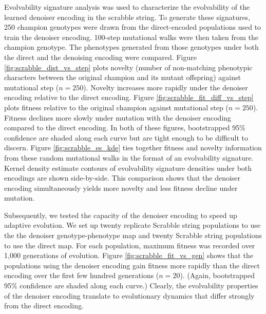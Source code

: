 Evolvability signature analysis was used to characterize the evolvability of the learned denoiser encoding in the scrabble string.
To generate these signatures, 250 champion genotypes were drawn from the direct-encoded populations used to train the denoiser encoding.
100-step mutational walks were then taken from the champion genotype.
The phenotypes generated from those genotypes under both the direct and the denoising encoding were compared.
Figure \ref{fig:scrabble_dist_vs_step} plots novelty (number of non-matching phenotypic characters between the original champion and its mutant offspring) against mutational step ($n=250$).
Novelty increases more rapidly under the denoiser encoding relative to the direct encoding.
Figure \ref{fig:scrabble_fit_diff_vs_step} plots fitness relative to the original champion against mutational step ($n=250$).
Fitness declines more slowly under mutation with the denoiser encoding compared to the direct encoding.
In both of these figures, bootstrapped 95\% confidence are shaded along each curve but are tight enough to be difficult to discern.
Figure \ref{fig:scrabble_es_kde} ties together fitness and novelty information from these random mutational walks in the format of an evolvability signature.
Kernel density estimate contours of evolvability signature densities under both encodings are shown side-by-side.
This comparison shows that the denoiser encoding simultaneously yields more novelty and less fitness decline under mutation.

Subsequently, we tested the capacity of the denoiser encoding to speed up adaptive evolution.
We set up twenty replicate Scrabble string populations to use the the denoiser genotype-phenotype map and twenty Scrabble string populations to use the direct map.
For each population, maximum fitness was recorded over 1,000 generations of evolution.
Figure \ref{fig:scrabble_fit_vs_gen} shows that the populations using the denoiser encoding gain fitness more rapidly than the direct encoding over the first few hundred generations ($n=20$).
(Again, bootstrapped 95\% confidence are shaded along each curve.)
Clearly, the evolvability properties of the denoiser encoding translate to evolutionary dynamics that differ strongly from the direct encoding.

